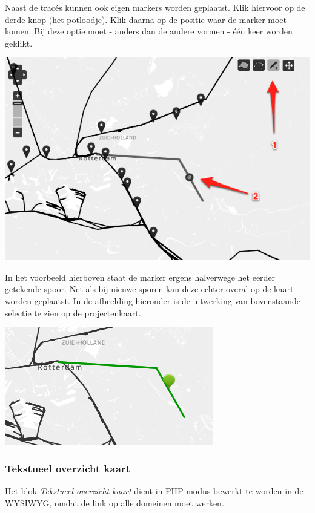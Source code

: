 Naast de trac\'{e}s kunnen ook eigen markers worden geplaatst. Klik hiervoor op de derde knop (het potloodje). Klik daarna op de positie waar de marker moet komen. Bij deze optie moet - anders dan de andere vormen - \'{e}\'{e}n keer worden geklikt.
\begin{center}
\includegraphics[scale=.7]{img/kaart9.png}
\end{center}
In het voorbeeld hierboven staat de marker ergens halverwege het eerder getekende spoor. Net als bij nieuwe sporen kan deze echter overal op de kaart worden geplaatst. In de afbeelding hieronder is de uitwerking van bovenstaande selectie te zien op de projectenkaart.
\begin{center}
\includegraphics[scale=.7]{img/kaart10.png}
\end{center}

\subsubsection{Tekstueel overzicht kaart}
Het blok \emph{Tekstueel overzicht kaart} dient in PHP modus bewerkt te worden in de WYSIWYG, omdat de link op alle domeinen moet werken.

